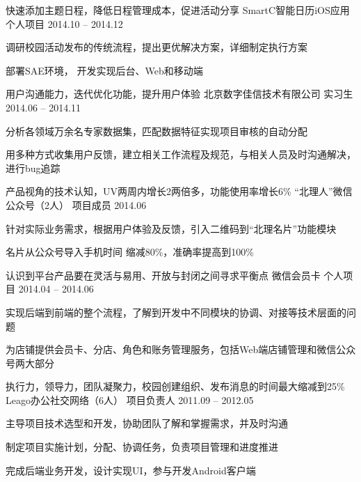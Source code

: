 \begin{cventries}
\cventry
{快速添加主题日程，降低日程管理成本，促进活动分享} %
{SmartC智能日历iOS应用} %
{个人项目} %
{2014.10 -- 2014.12} %
{ %
\begin{cvitems}
\item {调研校园活动发布的传统流程，提出更优解决方案，详细制定执行方案}
\item {部署SAE环境， 开发实现后台、Web和移动端}
\end{cvitems} 
}

\cventry
{用户沟通能力，迭代优化功能，提升用户体验} %
{北京数字佳信技术有限公司} %
{实习生} %
{2014.06 -- 2014.11} %
{ %
\begin{cvitems}
\item {分析各领域万余名专家数据集，匹配数据特征实现项目审核的自动分配}
\item {用多种方式收集用户反馈，建立相关工作流程及规范，与相关人员及时沟通解决，进行bug追踪}
\end{cvitems} 
}

\cventry
{产品视角的技术认知，UV两周内增长2两倍多，功能使用率增长6\%} %
{“北理人”微信公众号（2人）} %
{项目成员} %
{2014.06} %
{ %
\begin{cvitems}
\item {针对实际业务需求，根据用户体验及反馈，引入二维码到“北理名片”功能模块}
\item{名片从公众号导入手机时间 缩减80\%，准确率提高到100\%}
\end{cvitems} 
}

\cventry
{认识到平台产品要在灵活与易用、开放与封闭之间寻求平衡点} %
{微信会员卡} %
{个人项目} %
{2014.04 -- 2014.06} %
{ %
\begin{cvitems}
\item {实现后端到前端的整个流程，了解到开发中不同模块的协调、对接等技术层面的问题}
\item{为店铺提供会员卡、分店、角色和账务管理服务，包括Web端店铺管理和微信公众号两大部分}
\end{cvitems} 
}

\cventry
{执行力，领导力，团队凝聚力，校园创建组织、发布消息的时间最大缩减到25\%} %
{Leago办公社交网络（6人）} %
{项目负责人} %
{2011.09 -- 2012.05} %
{ %
\begin{cvitems}
\item {主导项目技术选型和开发，协助团队了解和掌握需求，并及时沟通}
\item {制定项目实施计划，分配、协调任务，负责项目管理和进度推进}
\item{完成后端业务开发，设计实现UI，参与开发Android客户端}
\end{cvitems}
}

\end{cventries}


